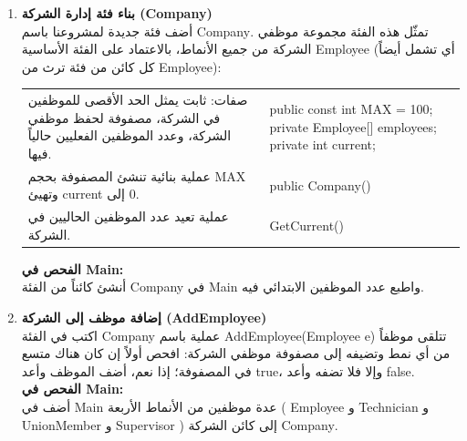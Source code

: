 \documentclass[14pt]{extarticle}
\begin{document}
\begin{enumerate}[label=\textbf{تمرين \arabic*:}, wide=0pt, itemsep=2.2em]

    \item \textbf{بناء فئة إدارة الشركة (\textenglish{Company})} \\
    أضف فئة جديدة لمشروعنا باسم \textenglish{Company}. تمثّل هذه الفئة مجموعة موظفي الشركة من جميع الأنماط، بالاعتماد على الفئة الأساسية \textenglish{Employee} (أي تشمل أيضاً كل كائن من فئة ترث من \textenglish{Employee}):

    {\renewcommand{\arraystretch}{1.2}
    \small
    \begin{longtable}{|>{\raggedleft\arraybackslash}p{}|>{\raggedright\arraybackslash}p{}|}
    \hline
    \multicolumn{2}{|c|}{\textbf{الفئة: \textenglish{Company}}} \\
    \hline
    صفات: ثابت يمثل الحد الأقصى للموظفين في الشركة، مصفوفة لحفظ موظفي الشركة، وعدد الموظفين الفعليين حالياً فيها. & \textenglish{public const int MAX = 100;} \newline \textenglish{private Employee[] employees;} \newline \textenglish{private int current;} \\
    \hline
    عملية بنائية تنشئ المصفوفة بحجم \textenglish{MAX} وتهيئ \textenglish{current} إلى $0$. & \textenglish{public Company()} \\
    \hline
    عملية تعيد عدد الموظفين الحاليين في الشركة. & \textenglish{GetCurrent()} \\
    \hline
    \end{longtable}}

    \vspace{1em}
    \noindent \textbf{الفحص في \textenglish{Main}:} \\
    أنشئ كائناً من الفئة \textenglish{Company} في \textenglish{Main} واطبع عدد الموظفين الابتدائي فيه.
    \filbreak

    \item \textbf{إضافة موظف إلى الشركة (\textenglish{AddEmployee})} \\
    اكتب في الفئة \textenglish{Company} عملية باسم \textenglish{AddEmployee(Employee e)} تتلقى موظفاً من أي نمط وتضيفه إلى مصفوفة موظفي الشركة: افحص أولاً إن كان هناك متسع في المصفوفة؛ إذا نعم، أضف الموظف وأعد \textenglish{true}، وإلا فلا تضفه وأعد \textenglish{false}. \\
    \textbf{الفحص في \textenglish{Main}:} \\
    أضف في \textenglish{Main} عدة موظفين من الأنماط الأربعة ( \textenglish{Employee} و \textenglish{Technician} و \textenglish{UnionMember} و \textenglish{Supervisor} ) إلى كائن الشركة \textenglish{Company}.
    \filbreak


\end{enumerate}
\end{document}
